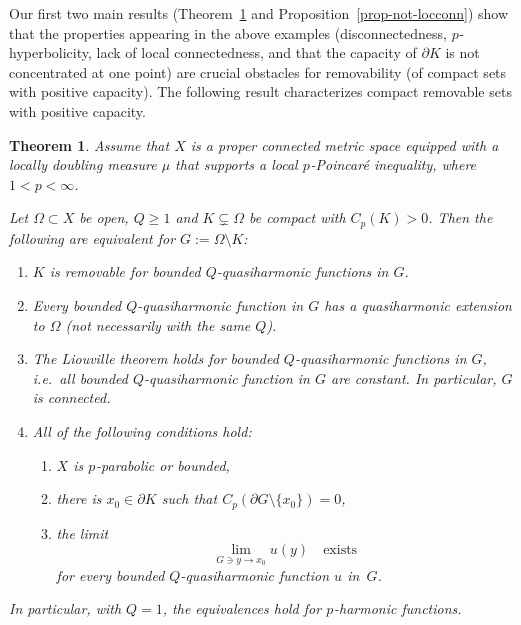 \documentclass[a4paper,twoside]{article}
\theoremstyle{propositional}
\newtheorem{thm}{Theorem}[section]
\theoremstyle{descriptive}
\theoremstyle{remarkstyle}
\newcommand{\setm}{\setminus}
\renewcommand{\subsetneq}{\varsubsetneq}
\newcommand{\Cp}{{C_p}}
\newcommand{\bdry}{\partial}
\newcommand{\bdy}{\bdry}
\newcommand{\Om}{\Omega}
\newcommand{\p}{{$p\mspace{1mu}$}}
\numberwithin{equation}{section}
\begin{document}
Our first two main results 
(Theorem~\ref{thm-main-char-intro} and Proposition~\ref{prop-not-locconn})
show that the properties appearing in the above examples
(disconnectedness, \p-hyperbolicity, lack of local connectedness, 
and that the capacity of $\bdy K$ is not concentrated at one point)
are crucial obstacles for removability
(of compact sets with positive capacity).
The following result  
characterizes compact removable sets with positive capacity.




\begin{thm} \label{thm-main-char-intro}
Assume that   $X$ is a proper connected metric space
equipped with a locally doubling measure $\mu$ that
supports a local \p-Poincar\'e inequality, where $1<p<\infty$.

Let  $\Om\subset X$ be  open, $Q\ge1$ and
$K \subsetneq \Om$ be compact with $\Cp(K)>0$.
Then the following are equivalent for $G:=\Om \setm K$\/\textup:
\begin{enumerate}
\item \label{f-rem}
$K$ is removable for bounded $Q$-quasiharmonic functions in $G$.
\item \label{f-weak}
Every bounded $Q$-quasiharmonic 
function in $G$ has a quasiharmonic extension to $\Om$
\textup(not necessarily with the same $Q$\textup).
\item \label{f-Li}
The Liouville theorem holds for bounded $Q$-quasiharmonic functions in $G$,
i.e.\ all bounded $Q$-quasiharmonic function in $G$ are constant.
In particular, $G$ is connected.
\item \label{f-char}
All of the following conditions hold\/\textup:
\begin{enumerate}
\renewcommand{\theenumii}{\textup{(\roman{enumii})}}%
\renewcommand{\labelenumii}{\theenumii}%
\makeatletter
\renewcommand\p@enumii{}%
\makeatother
\item \label{rs-par}
$X$ is \p-parabolic or bounded,
\item \label{rs1+2}
there is $x_0 \in \bdy K$ such that $\Cp(\bdy G \setm \{x_0\})=0$,
\item \label{rs-lim}
the limit 
\begin{equation}   \label{eq-lim-ex}
\lim_{G \ni y \to x_0} u(y) \quad \text{exists}
\end{equation}
for every bounded $Q$-quasiharmonic function $u$ in~$G$.
\end{enumerate}
\end{enumerate}
In particular, with $Q=1$, the 
equivalences hold for \p-harmonic functions.
\end{thm}
\end{document}
